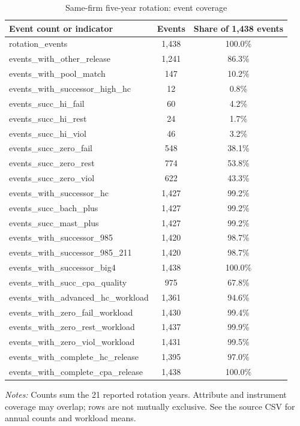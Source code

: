 \begin{table}[htbp]
\footnotesize
\centering
\caption{Same-firm five-year rotation: event coverage}
\begin{threeparttable}
\begin{tabular}{p{}cc}
\toprule
Event count or indicator & Events & Share of 1,438 events \\
\midrule
rotation\_events & 1,438 & 100.0\% \\
events\_with\_other\_release & 1,241 & 86.3\% \\
events\_with\_pool\_match & 147 & 10.2\% \\
events\_with\_successor\_high\_hc & 12 & 0.8\% \\
events\_succ\_hi\_fail & 60 & 4.2\% \\
events\_succ\_hi\_rest & 24 & 1.7\% \\
events\_succ\_hi\_viol & 46 & 3.2\% \\
events\_succ\_zero\_fail & 548 & 38.1\% \\
events\_succ\_zero\_rest & 774 & 53.8\% \\
events\_succ\_zero\_viol & 622 & 43.3\% \\
events\_with\_successor\_hc & 1,427 & 99.2\% \\
events\_succ\_bach\_plus & 1,427 & 99.2\% \\
events\_succ\_mast\_plus & 1,427 & 99.2\% \\
events\_with\_successor\_985 & 1,420 & 98.7\% \\
events\_with\_successor\_985\_211 & 1,420 & 98.7\% \\
events\_with\_successor\_big4 & 1,438 & 100.0\% \\
events\_with\_succ\_cpa\_quality & 975 & 67.8\% \\
events\_with\_advanced\_hc\_workload & 1,361 & 94.6\% \\
events\_with\_zero\_fail\_workload & 1,430 & 99.4\% \\
events\_with\_zero\_rest\_workload & 1,437 & 99.9\% \\
events\_with\_zero\_viol\_workload & 1,431 & 99.5\% \\
events\_with\_complete\_hc\_release & 1,395 & 97.0\% \\
events\_with\_complete\_cpa\_release & 1,438 & 100.0\% \\
\bottomrule
\end{tabular}
\begin{tablenotes}\footnotesize
\item \raggedright \textit{Notes:} Counts sum the 21 reported rotation years. Attribute and instrument coverage may overlap; rows are not mutually exclusive. See the source CSV for annual counts and workload means.
\end{tablenotes}
\end{threeparttable}
\end{table}
